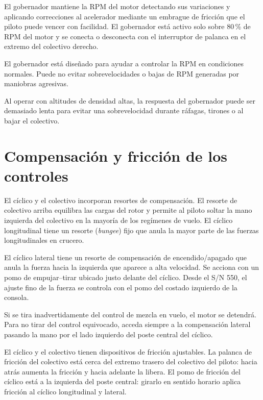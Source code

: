 El gobernador mantiene la RPM del motor detectando sus variaciones y aplicando correcciones al acelerador mediante un embrague de fricción que el piloto puede vencer con facilidad. El gobernador está activo solo sobre 80\,\% de RPM del motor y se conecta o desconecta con el interruptor de palanca en el extremo del colectivo derecho.

El gobernador está diseñado para ayudar a controlar la RPM en condiciones normales. Puede no evitar sobrevelocidades o bajas de RPM generadas por maniobras agresivas.

\begin{precaucion}
Al operar con altitudes de densidad altas, la respuesta del gobernador puede ser demasiado lenta para evitar una sobrevelocidad durante ráfagas, tirones o al bajar el colectivo.
\end{precaucion}

\section{Compensación y fricción de los controles}

El cíclico y el colectivo incorporan resortes de compensación. El resorte de colectivo arriba equilibra las cargas del rotor y permite al piloto soltar la mano izquierda del colectivo en la mayoría de los regímenes de vuelo. El cíclico longitudinal tiene un resorte (\emph{bungee}) fijo que anula la mayor parte de las fuerzas longitudinales en crucero.

El cíclico lateral tiene un resorte de compensación de encendido/apagado que anula la fuerza hacia la izquierda que aparece a alta velocidad. Se acciona con un pomo de empujar--tirar ubicado justo delante del cíclico. Desde el S/N 550, el ajuste fino de la fuerza se controla con el pomo del costado izquierdo de la consola.

\begin{precaucion}
Si se tira inadvertidamente del control de mezcla en vuelo, el motor se detendrá. Para no tirar del control equivocado, acceda siempre a la compensación lateral pasando la mano por el lado izquierdo del poste central del cíclico.
\end{precaucion}

El cíclico y el colectivo tienen dispositivos de fricción ajustables. La palanca de fricción del colectivo está cerca del extremo trasero del colectivo del piloto: hacia atrás aumenta la fricción y hacia adelante la libera. El pomo de fricción del cíclico está a la izquierda del poste central: girarlo en sentido horario aplica fricción al cíclico longitudinal y lateral.

